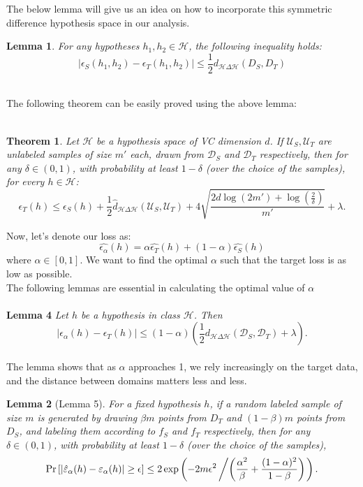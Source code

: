 \documentclass{article}
\newtheorem{lemma}{Lemma}
\newtheorem{theorem}{Theorem}
\begin{document}
The below lemma will give us an idea on how to incorporate this symmetric difference hypothesis space in our analysis.\\
\begin{lemma}
    For any hypotheses $h_1, h_2 \in \mathcal{H}$, the following inequality holds:
    \[
    | \epsilon_S(h_1, h_2) - \epsilon_T(h_1, h_2) | \leq \frac{1}{2} d_{\mathcal{H}\Delta \mathcal{H}}(D_S, D_T)
    \]
\end{lemma}
\\ 
The following theorem can be easily proved using the above lemma:
\\
\\
\begin{theorem}
\textit{Let $\mathcal{H}$ be a hypothesis space of VC dimension $d$. If $\mathcal{U}_S, \mathcal{U}_T$ are unlabeled samples of size $m'$ each, drawn from $\mathcal{D}_S$ and $\mathcal{D}_T$ respectively, then for any $\delta \in (0, 1)$, with probability at least $1 - \delta$ (over the choice of the samples), for every $h \in \mathcal{H}$:}
\[
\epsilon_T(h) \leq \epsilon_S(h) + \frac{1}{2} \hat{d}_{\mathcal{H} \Delta \mathcal{H}}(\mathcal{U}_S, \mathcal{U}_T) + 4 \sqrt{\frac{2d \log(2m') + \log\left(\frac{2}{\delta}\right)}{m'}} + \lambda.
\]
\end{theorem}
Now, let's denote our loss as:
\[
\hat{\epsilon_\alpha}(h) = \alpha \hat{\epsilon_T}(h) + (1-\alpha) \hat{\epsilon_S}(h)
\]
where $\alpha \in [0,1]$. We want to find the optimal $\alpha$ such that the target loss is as low as possible.
 \\
The following lemmas are essential in calculating the optimal value of $\alpha$
 \\ \\
 \textbf{Lemma 4} \textit{Let $h$ be a hypothesis in class $\mathcal{H}$. Then}
\[
|\epsilon_\alpha(h) - \epsilon_T(h)| \leq (1 - \alpha) \left( \frac{1}{2} d_{\mathcal{H} \Delta \mathcal{H}}(\mathcal{D}_S, \mathcal{D}_T) + \lambda \right).
\]
\\
The lemma shows that as $\alpha$ approaches 1, we rely increasingly on the target data, and the distance between domains matters less and less.

\begin{lemma}[Lemma 5]
For a fixed hypothesis $h$, if a random labeled sample of size $m$ is generated by drawing $\beta m$ points from $D_T$ and $(1 - \beta)m$ points from $D_S$, and labeling them according to $f_S$ and $f_T$ respectively, then for any $\delta \in (0,1)$, with probability at least $1 - \delta$ (over the choice of the samples),
\[
\Pr\left[|\hat{\varepsilon}_\alpha(h) - \varepsilon_\alpha(h)| \geq \epsilon \right] \leq 2 \exp\left(-2m\epsilon^2 \left/ \left( \frac{\alpha^2}{\beta} + \frac{(1 - \alpha)^2}{1 - \beta} \right) \right.\right).
\]
\end{lemma}
\end{document}
